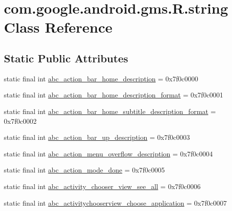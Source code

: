 \hypertarget{classcom_1_1google_1_1android_1_1gms_1_1R_1_1string}{}\section{com.\+google.\+android.\+gms.\+R.\+string Class Reference}
\label{classcom_1_1google_1_1android_1_1gms_1_1R_1_1string}
\subsection*{Static Public Attributes}
\begin{DoxyCompactItemize}
\item 
static final int \mbox{\hyperlink{classcom_1_1google_1_1android_1_1gms_1_1R_1_1string_abadcd325b1607690a502407891bb2c63}{abc\+\_\+action\+\_\+bar\+\_\+home\+\_\+description}} = 0x7f0c0000
\item 
static final int \mbox{\hyperlink{classcom_1_1google_1_1android_1_1gms_1_1R_1_1string_aea966db26d250a4352c020b6e8c135a0}{abc\+\_\+action\+\_\+bar\+\_\+home\+\_\+description\+\_\+format}} = 0x7f0c0001
\item 
static final int \mbox{\hyperlink{classcom_1_1google_1_1android_1_1gms_1_1R_1_1string_aa2180992f816c932c7ac48d7a9c1c850}{abc\+\_\+action\+\_\+bar\+\_\+home\+\_\+subtitle\+\_\+description\+\_\+format}} = 0x7f0c0002
\item 
static final int \mbox{\hyperlink{classcom_1_1google_1_1android_1_1gms_1_1R_1_1string_a4c68d3869b42a4d4b817fc2dfe2dd371}{abc\+\_\+action\+\_\+bar\+\_\+up\+\_\+description}} = 0x7f0c0003
\item 
static final int \mbox{\hyperlink{classcom_1_1google_1_1android_1_1gms_1_1R_1_1string_ae8d8810e11bd270b1aa71211b8be2b8a}{abc\+\_\+action\+\_\+menu\+\_\+overflow\+\_\+description}} = 0x7f0c0004
\item 
static final int \mbox{\hyperlink{classcom_1_1google_1_1android_1_1gms_1_1R_1_1string_adcb994810bf327be42508dad2ffe6e9e}{abc\+\_\+action\+\_\+mode\+\_\+done}} = 0x7f0c0005
\item 
static final int \mbox{\hyperlink{classcom_1_1google_1_1android_1_1gms_1_1R_1_1string_a8cc62d7cb6099261babb15fe543ca444}{abc\+\_\+activity\+\_\+chooser\+\_\+view\+\_\+see\+\_\+all}} = 0x7f0c0006
\item 
static final int \mbox{\hyperlink{classcom_1_1google_1_1android_1_1gms_1_1R_1_1string_a1154a8a401abbf37a2d714115dc7e73c}{abc\+\_\+activitychooserview\+\_\+choose\+\_\+application}} = 0x7f0c0007

\end{DoxyCompactItemize}
